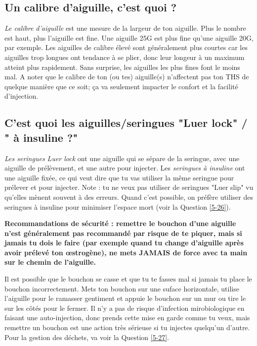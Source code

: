 \documentclass{article}
\begin{document}
\subsection{Un calibre d'aiguille, c'est quoi ?}

\textit{Le calibre d'aiguille} est une mesure de la largeur de ton aiguille. Plus le nombre est haut, plus l'aiguille est fine. Une aiguille 25G est plus fine qu'une aiguille 20G, par exemple. Les aiguilles de calibre élevé sont généralement plus courtes car les aiguilles trop longues ont tendance à se plier, donc leur longeur à un maximum atteint plus rapidement. Sans surprise, les aiguilles les plus fines font le moins mal. A noter que le calibre de ton (ou tes) aiguille(s) n'affectent pas ton THS de quelque manière que ce soit; ça va seulement impacter le confort et la facilité d'injection.

\subsection{C'est quoi les aiguilles/seringues "Luer lock" / " à insuline ?"}\label{5-13}

\textit{Les seringues Luer lock} ont une aiguille qui se sépare de la seringue, avec une aiguille de prélèvement, et une autre pour injecter. Les \textit{seringues à insuline} ont une aiguille fixée, ce qui veut dire que tu vas utiliser la même seringue pour prélever et pour injecter. Note : tu ne veux pas utiliser de seringues "Luer slip" vu qu'elles mènent souvent à des erreurs. Quand c'est possible, on préfère utiliser des seringues à insuline pour minimiser l'espace mort (voir la Question \ref{5-26}).

\textbf{Recommandations de sécurité : remettre le bouchon d'une aiguille n'est généralement pas recommandé par risque de te piquer, mais si jamais tu dois le faire (par exemple quand tu change d'aiguille après avoir prélevé ton œstrogène), ne mets JAMAIS de force avec ta main sur le chemin de l'aiguille.}

Il est possible que le bouchon se casse et que tu te fasses mal si jamais tu place le bouchon incorrectement. Mets ton bouchon sur une suface horizontale, utilise l'aiguille pour le ramasser gentiment et appuie le bouchon sur un mur ou tire le sur les côtés pour le fermer. Il n'y a pas de risque d'infection mirobiologique en faisant une auto-injection, donc prends cette mise en garde comme tu veux, mais remettre un bouchon est une action très sérieuse si tu injectes quelqu'un d'autre. Pour la gestion des déchets, va voir la Question \ref{5-27}.
\end{document}
